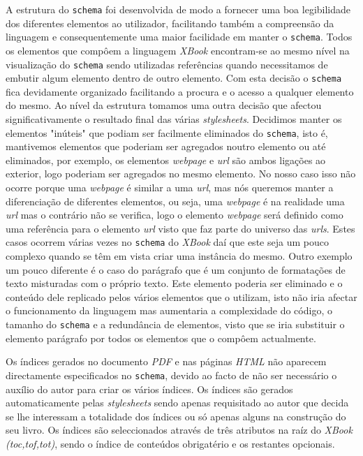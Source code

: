 \documentclass[a4paper]{article}
\begin{document}
\hspace{1cm}A estrutura do \verb|schema| foi desenvolvida de modo a fornecer uma boa legibilidade dos diferentes elementos ao utilizador, facilitando também a compreensão da linguagem e consequentemente uma maior facilidade em manter o \verb|schema|. Todos os elementos que compôem a linguagem \emph{XBook} encontram-se ao mesmo nível na visualização do \verb|schema| sendo utilizadas referências quando necessitamos de embutir algum elemento dentro de outro elemento. Com esta decisão o \verb|schema| fica devidamente organizado facilitando a procura e o acesso a qualquer elemento do mesmo. Ao nível da estrutura tomamos uma outra decisão que afectou significativamente o resultado final das várias \emph{stylesheets}. Decidimos manter os elementos "inúteis" que podiam ser facilmente eliminados do \verb|schema|, isto é, mantivemos elementos que poderiam ser agregados noutro elemento ou até eliminados, por exemplo, os elementos \emph{webpage} e \emph{url} são ambos ligações ao exterior, logo poderiam ser agregados no mesmo elemento. No nosso caso isso não ocorre porque uma \emph{webpage} é similar a uma \emph{url}, mas nós queremos manter a diferenciação de diferentes elementos, ou seja, uma \emph{webpage} é na realidade uma \emph{url} mas o contrário não se verifica, logo o elemento \emph{webpage} será definido como uma referência para o elemento \emph{url} visto que faz parte do universo das \emph{urls}. Estes casos ocorrem várias vezes no \verb|schema| do \emph{XBook} daí que este seja um pouco complexo quando se têm em vista criar uma instância do mesmo. Outro exemplo um pouco diferente é o caso do parágrafo que é um conjunto de formatações de texto misturadas com o próprio texto. Este elemento poderia ser eliminado e o conteúdo dele replicado pelos vários elementos que o utilizam, isto não iria afectar o funcionamento da linguagem mas aumentaria a complexidade do código, o tamanho do \verb|schema| e a redundância de elementos, visto que se iria substituir o elemento parágrafo por todos os elementos que o compôem actualmente.

\hspace{1cm}Os índices gerados no documento \emph{PDF} e nas páginas \emph{HTML} não aparecem directamente especificados no \verb|schema|, devido ao facto de não ser necessário o auxílio do autor para criar os vários índices. Os índices são gerados automaticamente pelas \emph{stylesheets} sendo apenas requisitado ao autor que decida se lhe interessam a totalidade dos índices ou só apenas alguns na construção do seu livro. Os índices são seleccionados através de três atributos na raíz do
\emph{XBook} \emph{(toc,tof,tot)}, sendo o índice de conteúdos obrigatério e os restantes opcionais.
\end{document}

